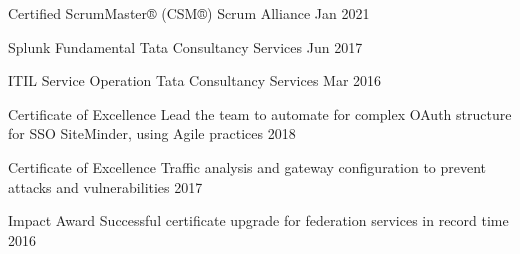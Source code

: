 

\begin{cvhonors}

  \cvhonor
    {Certified ScrumMaster® (CSM®)} %
    {Scrum Alliance} %
    {Jan 2021} %
    {} %

  \cvhonor
    {Splunk Fundamental} %
    {Tata Consultancy Services} %
    {Jun 2017} %
    {} %

  \cvhonor
    {ITIL Service Operation} %
    {Tata Consultancy Services} %
    {Mar 2016} %
    {} %

\end{cvhonors}


\begin{cvhonors}

  \cvhonor
    {Certificate of Excellence} %
    {Lead the team to automate for complex OAuth structure for SSO SiteMinder, using Agile practices} %
    {2018} %
    {} %

  \cvhonor
    {Certificate of Excellence} %
    {Traffic analysis and gateway configuration to prevent attacks and vulnerabilities} %
    {2017} %
    {} %

  \cvhonor
    {Impact Award} %
    {Successful certificate upgrade for federation services in record time} %
    {2016} %
    {} %

\end{cvhonors}
